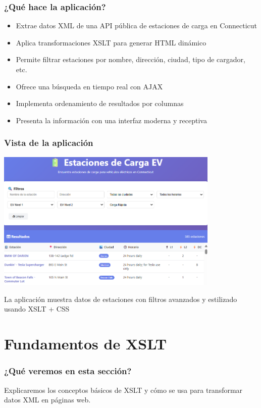 \documentclass{beamer}
\begin{document}
  \begin{frame}
  \frametitle{¿Qué hace la aplicación?}
  \begin{itemize}
      \item Extrae datos XML de una API pública de estaciones de carga en Connecticut
      \item Aplica transformaciones XSLT para generar HTML dinámico
      \item Permite filtrar estaciones por nombre, dirección, ciudad, tipo de cargador, etc.
      \item Ofrece una búsqueda en tiempo real con AJAX
      \item Implementa ordenamiento de resultados por columnas
      \item Presenta la información con una interfaz moderna y receptiva
  \end{itemize}
  \end{frame}

  \begin{frame}
  \frametitle{Vista de la aplicación}
  \begin{center}


  \includegraphics[width=0.8\textwidth]{Imagenes/presentacion1.png} %

  La aplicación muestra datos de estaciones con filtros avanzados y estilizado usando XSLT + CSS
  \end{center}
  \end{frame}

\section{Fundamentos de XSLT}

\begin{frame}
\frametitle{¿Qué veremos en esta sección?}
Explicaremos los conceptos básicos de XSLT y cómo se usa para transformar datos XML en páginas web.
\end{frame}
\end{document}
